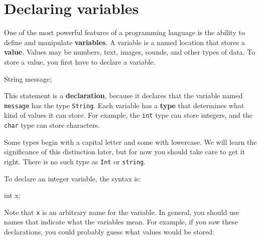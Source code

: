 \documentclass[12pt]{book}
\theoremstyle{exercise}
\newcommand{\java}[1]{\verb"#1"}
\begin{document}
\section{Declaring variables}



One of the most powerful features of a programming language is the ability to define and manipulate {\bf variables}.
A variable is a named location that stores a {\bf value}.
Values may be numbers, text, images, sounds, and other types of data.
To store a value, you first have to declare a variable.

\begin{code}
    String message;
\end{code}


This statement is a {\bf declaration}, because it declares that the variable named \java{message} has the type \java{String}.
Each variable has a {\bf type} that determines what kind of values it can store.
For example, the \java{int} type can store integers, and the \java{char} type can store characters.

Some types begin with a capital letter and some with lowercase.
We will learn the significance of this distinction later, but for now you should take care to get it right.
There is no such type as \java{Int} or \java{string}.

To declare an integer variable, the syntax is:

\begin{code}
    int x;
\end{code}

Note that \java{x} is an arbitrary name for the variable.
In general, you should use names that indicate what the variables mean.
For example, if you saw these declarations, you could probably guess what values would be stored:
\end{document}
